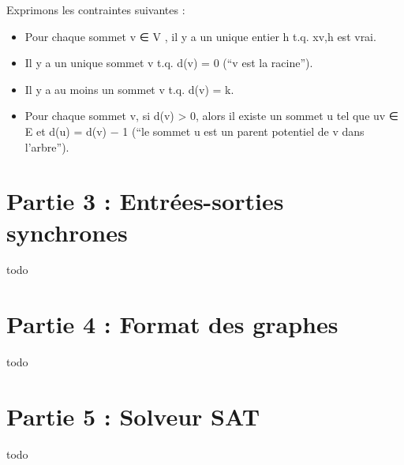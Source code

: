 \documentclass[a4paper]{article}
\begin{document}
Exprimons les contraintes suivantes : \\
\begin{itemize}

\item Pour chaque sommet v ∈ V , il y a un unique entier h t.q. xv,h est vrai.
\item Il y a un unique sommet v t.q. d(v) = 0 (“v est la racine”).
\item Il y a au moins un sommet v t.q. d(v) = k.
\item Pour chaque sommet v, si d(v) > 0, alors il existe un sommet u tel que uv ∈ E et d(u) = d(v) − 1 (“le sommet u est un parent potentiel de v dans l’arbre”).
\end{itemize}


\section{Partie 3 : Entrées-sorties synchrones}

todo


\section{Partie 4 : Format des graphes}

todo


\section{Partie 5 : Solveur SAT}

todo

\end{document}
